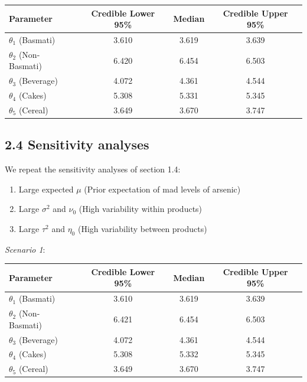 \documentclass[]{article}
\begin{document}
\begin{center}
  \begin{tabular}{l c c c}
  \hline Parameter & Credible Lower 95\% & Median & Credible Upper 95\%  \\ \hline
    $\theta_1$ (Basmati) & 3.610 & 3.619 & 3.639 \\ 
    $\theta_2$ (Non-Basmati) & 6.420 & 6.454 & 6.503 \\
    $\theta_3$ (Beverage) & 4.072 & 4.361 & 4.544 \\
    $\theta_4$ (Cakes) & 5.308 & 5.331 & 5.345 \\
    $\theta_5$ (Cereal) & 3.649 & 3.670 & 3.747 \\ \hline
  \end{tabular}
\end{center}

\subsection{2.4 Sensitivity analyses}

We repeat the sensitivity analyses of section 1.4:

\begin{enumerate}
  \item Large expected $\mu$ (Prior expectation of mad levels of arsenic)
  \item Large $\sigma^2$ and $\nu_0$ (High variability within products)
  \item Large $\tau^2$ and $\eta_0$ (High variability between products)
\end{enumerate}

\textit{Scenario 1}:

\begin{center}
  \begin{tabular}{l c c c}
  \hline Parameter & Credible Lower 95\% & Median & Credible Upper 95\%  \\ \hline
    $\theta_1$ (Basmati) & 3.610 & 3.619 & 3.639 \\ 
    $\theta_2$ (Non-Basmati) & 6.421 & 6.454 & 6.503 \\
    $\theta_3$ (Beverage) & 4.072 & 4.361 & 4.544 \\
    $\theta_4$ (Cakes) & 5.308 & 5.332 & 5.345 \\
    $\theta_5$ (Cereal) & 3.649 & 3.670 & 3.747 \\ \hline
  \end{tabular}
\end{center}
\end{document}
